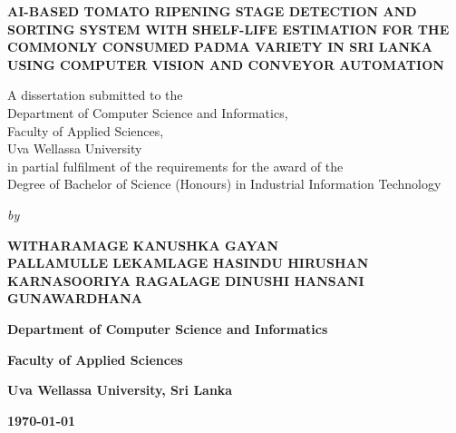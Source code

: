 \begin{titlepage}
    \centering

    \textbf{\Large AI-BASED TOMATO RIPENING STAGE DETECTION AND SORTING SYSTEM WITH SHELF-LIFE ESTIMATION FOR THE COMMONLY CONSUMED PADMA VARIETY IN SRI LANKA USING COMPUTER VISION AND CONVEYOR AUTOMATION}

    \vfill

    \begin{center}
        A dissertation submitted to the \\
        Department of Computer Science and Informatics, \\
        Faculty of Applied Sciences, \\
        Uva Wellassa University \\
        in partial fulfilment of the requirements for the award of the \\
        Degree of Bachelor of Science (Honours) in Industrial Information Technology
    \end{center}

    \vfill

    \textit{by}

    \begin{center}
        \textbf{\large WITHARAMAGE KANUSHKA GAYAN} \\
        \textbf{\large PALLAMULLE LEKAMLAGE HASINDU HIRUSHAN} \\
        \textbf{\large KARNASOORIYA RAGALAGE DINUSHI HANSANI GUNAWARDHANA} \\
    \end{center}

    \vfill

    \textbf{\large Department of Computer Science and Informatics}

    \textbf{\large Faculty of Applied Sciences}

    \textbf{\large Uva Wellassa University, Sri Lanka}

    \vspace{0.5cm}

    \textbf{\large \monthyeardate\today}
\end{titlepage}
